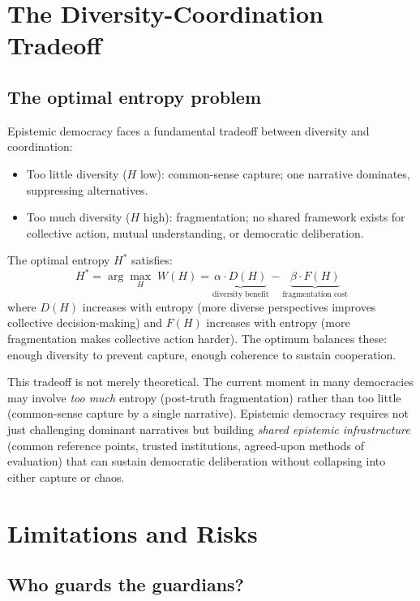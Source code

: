 \section{The Diversity-Coordination Tradeoff}
\label{sec:ch32-tradeoff}

\subsection{The optimal entropy problem}

\begin{model}
\label{mod:optimal-entropy}
Epistemic democracy faces a fundamental tradeoff between diversity and coordination:
\begin{itemize}[nosep]
  \item Too little diversity ($H$ low): common-sense capture; one narrative dominates, suppressing alternatives.
  \item Too much diversity ($H$ high): fragmentation; no shared framework exists for collective action, mutual understanding, or democratic deliberation.
\end{itemize}
The optimal entropy $H^*$ satisfies:
\[
  H^* = \arg\max_H \; W(H) = \underbrace{\alpha \cdot D(H)}_{\text{diversity benefit}} - \underbrace{\beta \cdot F(H)}_{\text{fragmentation cost}}
\]
where $D(H)$ increases with entropy (more diverse perspectives improves collective decision-making) and $F(H)$ increases with entropy (more fragmentation makes collective action harder).
The optimum balances these: enough diversity to prevent capture, enough coherence to sustain cooperation.
\end{model}

This tradeoff is not merely theoretical.
The current moment in many democracies may involve \emph{too much} entropy (post-truth fragmentation) rather than too little (common-sense capture by a single narrative).
Epistemic democracy requires not just challenging dominant narratives but building \emph{shared epistemic infrastructure} (common reference points, trusted institutions, agreed-upon methods of evaluation) that can sustain democratic deliberation without collapsing into either capture or chaos.

\section{Limitations and Risks}
\label{sec:ch32-limits}

\subsection{Who guards the guardians?}

